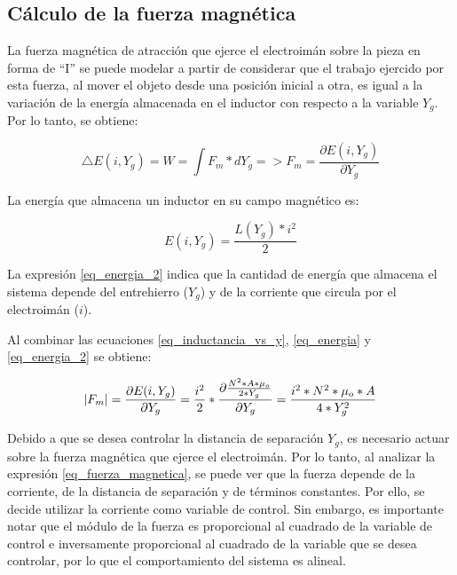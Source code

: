 \subsection{Cálculo de la fuerza magnética}\label{sec:fuerza_magnetica}

\noindent La fuerza magnética de atracción que ejerce el electroimán sobre la pieza en forma de ``I'' se puede modelar a partir de considerar que el trabajo ejercido por esta fuerza, al mover el objeto desde una posición inicial a otra, es igual a la variación de la energía almacenada en el inductor con respecto a la variable $Y_g$. Por lo tanto, se obtiene:

\begin{equation}\label{eq_energia}
	\triangle E(i,Y_g)=W=\int{F_{m}*dY_g}=>F_{m}=\frac{\partial{E(i,Y_g)}}{\partial{Y_g}}
\end{equation}

\noindent La energía que almacena un inductor en su campo magnético es:

\begin{equation}\label{eq_energia_2}
	E(i,Y_g)=\frac{L(Y_g)*i^{2}}{2}
\end{equation}

\noindent La expresión \ref{eq_energia_2} indica que la cantidad de energía que almacena el sistema depende del entrehierro ($Y_{g}$) y de la corriente que circula por el electroimán ($i$). 

\noindent Al combinar las ecuaciones \ref{eq_inductancia_vs_y}, \ref{eq_energia} y \ref{eq_energia_2} se obtiene:

\begin{equation}\label{eq_fuerza_magnetica}
	\lvert F_{m}\rvert=\frac{\partial{E(i,Y_g)}}{\partial{Y_g}}=\frac{i^{2}}{2}*\frac{\partial{\frac{{N^{2}*A*\mu_{o}}}{2*Y_{g}}}}{\partial{Y_g}}=\frac{i^{2}*N^{2}*\mu_{o}*A}{4*Y_{g}^{2}}
\end{equation}

Debido a que se desea controlar la distancia de separación $Y_g$, es necesario actuar sobre la fuerza magnética que ejerce el electroimán. Por lo tanto, al analizar la expresión \ref{eq_fuerza_magnetica}, se puede ver que la fuerza depende de la corriente, de la distancia de separación y de términos constantes. Por ello, se decide utilizar la corriente como variable de control. Sin embargo, es importante notar que el módulo de la fuerza es proporcional al cuadrado de la variable de control e inversamente proporcional al cuadrado de la variable que se desea controlar, por lo que el comportamiento del sistema es alineal.

